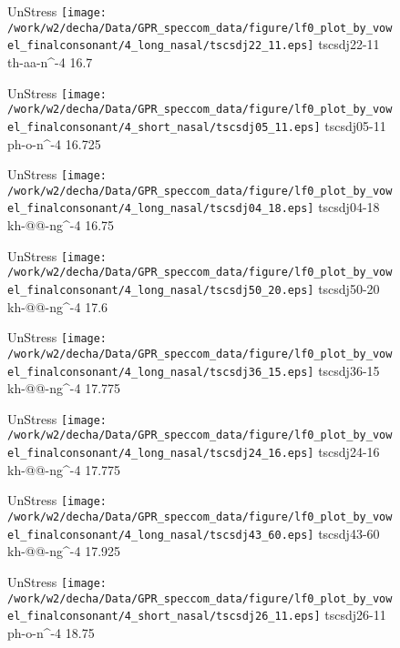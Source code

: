 \documentclass{article}
\begin{document}
\begin{figure}[t]
\begin{minipage}[b]{.24\textwidth}
UnStress
\centering
\texttt{[image: /work/w2/decha/Data/GPR\_speccom\_data/figure/lf0\_plot\_by\_vowel\_finalconsonant/4\_long\_nasal/tscsdj22\_11.eps]}
tscsdj22-11 th-aa-n\textasciicircum-4 16.7
\end{minipage}
\begin{minipage}[b]{.24\textwidth}
UnStress
\centering
\texttt{[image: /work/w2/decha/Data/GPR\_speccom\_data/figure/lf0\_plot\_by\_vowel\_finalconsonant/4\_short\_nasal/tscsdj05\_11.eps]}
tscsdj05-11 ph-o-n\textasciicircum-4 16.725
\end{minipage}
\begin{minipage}[b]{.24\textwidth}
UnStress
\centering
\texttt{[image: /work/w2/decha/Data/GPR\_speccom\_data/figure/lf0\_plot\_by\_vowel\_finalconsonant/4\_long\_nasal/tscsdj04\_18.eps]}
tscsdj04-18 kh-@@-ng\textasciicircum-4 16.75
\end{minipage}
\begin{minipage}[b]{.24\textwidth}
UnStress
\centering
\texttt{[image: /work/w2/decha/Data/GPR\_speccom\_data/figure/lf0\_plot\_by\_vowel\_finalconsonant/4\_long\_nasal/tscsdj50\_20.eps]}
tscsdj50-20 kh-@@-ng\textasciicircum-4 17.6
\end{minipage}
\end{figure}
\clearpage
\begin{figure}[t]
\begin{minipage}[b]{.24\textwidth}
UnStress
\centering
\texttt{[image: /work/w2/decha/Data/GPR\_speccom\_data/figure/lf0\_plot\_by\_vowel\_finalconsonant/4\_long\_nasal/tscsdj36\_15.eps]}
tscsdj36-15 kh-@@-ng\textasciicircum-4 17.775
\end{minipage}
\begin{minipage}[b]{.24\textwidth}
UnStress
\centering
\texttt{[image: /work/w2/decha/Data/GPR\_speccom\_data/figure/lf0\_plot\_by\_vowel\_finalconsonant/4\_long\_nasal/tscsdj24\_16.eps]}
tscsdj24-16 kh-@@-ng\textasciicircum-4 17.775
\end{minipage}
\begin{minipage}[b]{.24\textwidth}
UnStress
\centering
\texttt{[image: /work/w2/decha/Data/GPR\_speccom\_data/figure/lf0\_plot\_by\_vowel\_finalconsonant/4\_long\_nasal/tscsdj43\_60.eps]}
tscsdj43-60 kh-@@-ng\textasciicircum-4 17.925
\end{minipage}
\begin{minipage}[b]{.24\textwidth}
UnStress
\centering
\texttt{[image: /work/w2/decha/Data/GPR\_speccom\_data/figure/lf0\_plot\_by\_vowel\_finalconsonant/4\_short\_nasal/tscsdj26\_11.eps]}
tscsdj26-11 ph-o-n\textasciicircum-4 18.75
\end{minipage}
\end{figure}
\end{document}
